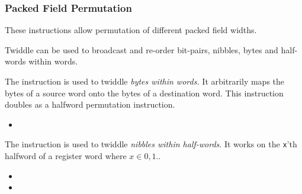 \subsubsection{Packed Field Permutation}
\label{sec:packed-field-instructions}

These instructions allow permutation of different packed field widths.

Twiddle can be used to broadcast and re-order bit-pairs, nibbles, bytes
and half-words within words.

{\ienctwidb}
{
The  instruction is used to twiddle {\em bytes within words.}
It arbitrarily maps the bytes of a source word onto the bytes of a
destination word.
This instruction doubles as a halfword permutation instruction.
}{
\begin{itemize}
\item {}
\end{itemize}
}{}

{\ienctwidnzero\ienctwidnone}
{
The  instruction is used to twiddle {\em nibbles within 
half-words}.
It works on the {\tt x}'th halfword of a register word where
$x\in{0,1}.$.
}{
\begin{itemize}
\item {}
\item {}
\end{itemize}
}{}


